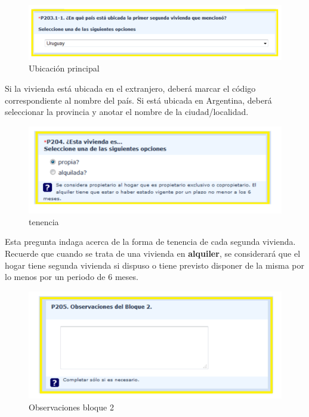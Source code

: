 \documentclass[
  openany]{book}
\begin{document}
\begin{figure}

{\centering \includegraphics[width=1\linewidth]{imagenes/figura6-68} 

}

\caption{Ubicación principal}\label{fig:ubicac}
\end{figure}

Si la vivienda está ubicada en el extranjero, deberá marcar el código correspondiente al nombre del país. Si está ubicada en Argentina, deberá seleccionar la provincia y anotar el nombre de la ciudad/localidad.

\begin{figure}

{\centering \includegraphics[width=1\linewidth]{imagenes/figura6-69} 

}

\caption{tenencia}\label{fig:tendencia}
\end{figure}

Esta pregunta indaga acerca de la forma de tenencia de cada segunda vivienda. Recuerde que cuando se trata de una vivienda en \textbf{alquiler}, se considerará que el hogar tiene segunda vivienda si dispuso o tiene previsto disponer de la misma por lo menos por un periodo de 6 meses.

\begin{figure}

{\centering \includegraphics[width=1\linewidth]{imagenes/figura6-70} 

}

\caption{Observaciones bloque 2}\label{fig:findelbloque2}
\end{figure}
\end{document}
